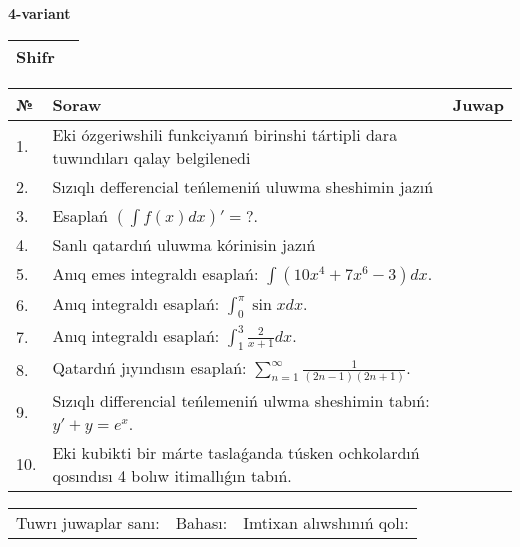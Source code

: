 \documentclass{article}
\begin{document}
  \egroup
  
  \newpage
  
  
  \textbf{4-variant}\\
  
  \bgroup
  \def\arraystretch{1.6} %
  
  \begin{tabular}{|m{5.7cm}|m{9.5cm}|}
  \hline
  Shifr & \\
  \hline
  \end{tabular}
  
  \vspace{1cm}
  
  \begin{tabular}{|m{0.7cm}|m{10cm}|m{4cm}|}
  \hline
  № & Soraw & Juwap \\
  \hline
  1. & Eki ózgeriwshili funkciyanıń birinshi tártipli dara tuwındıları qalay belgilenedi &  \\
  \hline
  2. & Sızıqlı defferencial teńlemeniń uluwma sheshimin jazıń &  \\
  \hline
  3. & Esaplań \(\left( \int{f(x)dx} \right)' = ?\). &  \\
  \hline
  4. & Sanlı qatardıń uluwma kórinisin jazıń &  \\
  \hline
  5. & Anıq emes integraldı esaplań: \(\int{\left( 10x^{4} + 7x^{6} - 3 \right)dx}\). &  \\
  \hline
  6. & Anıq integraldı esaplań: \(\int_{0}^{\pi}{\sin xdx}\). &  \\
  \hline
  7. & Anıq integraldı esaplań: \(\int_{1}^{3}\frac{2}{x + 1}dx\). &  \\
  \hline
  8. & Qatardıń jıyındısın esaplań: \(\sum_{n = 1}^{\infty}\frac{1}{(2n - 1)(2n + 1)}\). &  \\
  \hline
  9. & Sızıqlı differencial teńlemeniń ulwma sheshimin tabıń: \(y' + y = e^{x}\). &  \\
  \hline
  10. & Eki kubikti bir márte taslaǵanda túsken ochkolardıń qosındısı 4 bolıw itimallıǵın tabıń. &  \\
  \hline
  \end{tabular}
  
  \vspace{1cm}
  
  \begin{tabular}{lll}
  Tuwrı juwaplar sanı: \underline{\hspace{1.5cm}} & 
  Bahası: \underline{\hspace{1.5cm}} & 
  Imtixan alıwshınıń qolı: \underline{\hspace{2cm}} \\
  \end{tabular}
  
\end{document}
